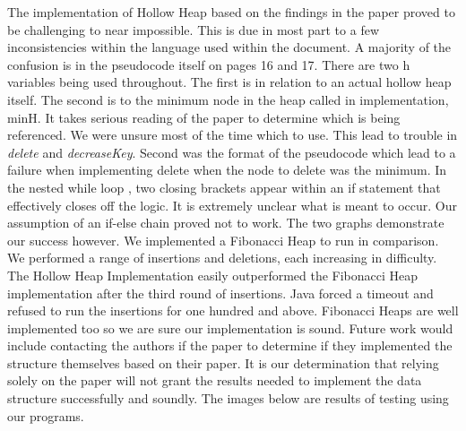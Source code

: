 \documentclass[letter,10pt]{article}
\begin{document}
The implementation of Hollow Heap based on the findings in the paper proved to be challenging to near impossible. This is due in most part to a few inconsistencies within the language used within the document. A majority of the confusion is in the pseudocode itself on pages 16 and 17. There are two h variables being used throughout. The first is in relation to an actual hollow heap itself. The second is to the minimum node in the heap called in implementation, minH. It takes serious reading of the paper to determine which is being referenced. We were unsure most of the time which to use. This lead to trouble in \textit{delete} and \textit{decreaseKey}. Second was the format of the pseudocode which lead to a failure when implementing delete when the node to delete was the minimum.  In the nested while loop , two closing brackets appear within an if statement that effectively closes off the logic. It is extremely unclear what is meant to occur. Our assumption of an if-else chain proved not to work. The two graphs demonstrate our success however. We implemented a Fibonacci Heap to run in comparison. We performed a range of insertions and deletions, each increasing in difficulty. The Hollow Heap Implementation easily outperformed the Fibonacci Heap implementation after the third round of insertions. Java forced a timeout and refused to run the insertions for one hundred and above. Fibonacci Heaps are well implemented too so we are sure our implementation is sound. Future work would include contacting the authors if the paper to determine if they implemented the structure themselves based on their paper. It is our determination that relying solely on the paper will not grant the results needed to implement the data structure successfully and soundly. The images below are results of testing using our programs. 
\end{document}
